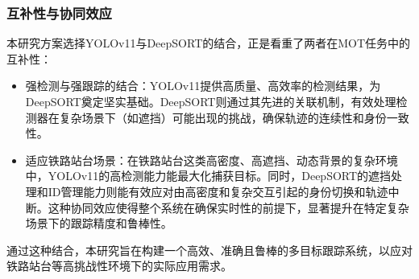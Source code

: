 \subsubsection{互补性与协同效应}

本研究方案选择YOLOv11与DeepSORT的结合，正是看重了两者在MOT任务中的互补性：
\begin{itemize}
    \item 强检测与强跟踪的结合：YOLOv11提供高质量、高效率的检测结果，为DeepSORT奠定坚实基础。DeepSORT则通过其先进的关联机制，有效处理检测器在复杂场景下（如遮挡）可能出现的挑战，确保轨迹的连续性和身份一致性。
    \item 适应铁路站台场景：在铁路站台这类高密度、高遮挡、动态背景的复杂环境中，YOLOv11的高检测能力能最大化捕获目标。同时，DeepSORT的遮挡处理和ID管理能力则能有效应对由高密度和复杂交互引起的身份切换和轨迹中断。这种协同效应使得整个系统在确保实时性的前提下，显著提升在特定复杂场景下的跟踪精度和鲁棒性。
\end{itemize}

通过这种结合，本研究旨在构建一个高效、准确且鲁棒的多目标跟踪系统，以应对铁路站台等高挑战性环境下的实际应用需求。
\fi